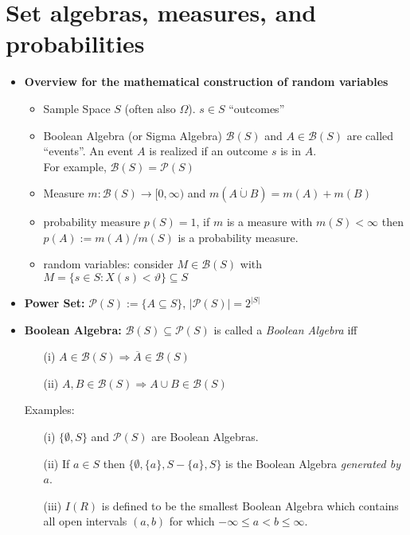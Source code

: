 \section{Set algebras, measures, and probabilities}
\begin{itemize}
\item {\bf Overview for the mathematical construction of random variables}
\begin{itemize}
\item Sample Space $S$ (often also $\Omega $). $s\in S$ ``outcomes''
\item Boolean Algebra (or Sigma Algebra)  $\mathcal{B}(S)$ and $A \in \mathcal{B}(S)$ are called ``events''. An event $A$ is realized if an outcome $s$ is in $A$. \\For example, $\mathcal{B}(S)=\mathcal{P}(S)$
\item Measure $m: \mathcal{B}(S) \to [0,\infty)$ and $m(A\dot\cup B) = m(A) + m(B)$
\item probability measure $p(S)=1$, if $m$ is a measure with $m(S)<\infty$ then $p(A) := m(A)/m(S)$ is a probability measure.
\item random variables: consider $M \in \mathcal{B}(S)$ with $M=\{s \in S: X(s) < \vartheta\} \subseteq S$
\end{itemize}

\item {\bf Power Set:}  $\mathcal{P}(S) := \{A\subseteq S\}$, $|\mathcal{P}(S) |= 2^{|S|}$

\item {\bf Boolean Algebra:}  $\mathcal{B}(S) \subseteq \mathcal{P}(S)$ is called a {\it Boolean Algebra} iff
\begin{itemize}
\item[(i)] $A \in \mathcal{B}(S)  \Rightarrow \overline{A} \in \mathcal{B}(S)  $
\item[(ii)] $A, B \in \mathcal{B}(S)  \Rightarrow A \cup B \in \mathcal{B}(S)  $ 
\end{itemize}
Examples:
\begin{itemize}
\item[(i)] $\{ \emptyset, S\}  $ and $\mathcal{P}(S)$ are Boolean Algebras.
\item[(ii)] If $a\in S$ then $\{\emptyset, \{a\}, S-\{a\}, S\}$ is the Boolean Algebra {\it generated by} $a$.
\item[(iii)] $I(R)$ is defined to be the smallest Boolean Algebra which contains all open intervals $(a,b)$ for which $-\infty \le a < b\le \infty$. 
\end{itemize}


\end{itemize}
